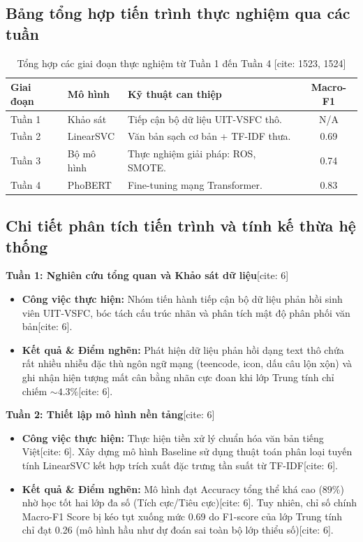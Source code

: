 \documentclass[conference,10pt,a4paper]{IEEEtran}
\begin{document}
\subsection{Bảng tổng hợp tiến trình thực nghiệm qua các tuần}
\begin{table}[H]
\centering
\caption{Tổng hợp các giai đoạn thực nghiệm từ Tuần 1 đến Tuần 4 [cite: 1523, 1524]}
\vspace{0.15cm}
\small
\renewcommand{\arraystretch}{1.2}
\begin{tabular}{|p{1.2cm}|p{1.5cm}|p{3.1cm}|c|}
\hline
\textbf{Giai đoạn} & \textbf{Mô hình} & \textbf{Kỹ thuật can thiệp} & \textbf{Macro-F1} \\
\hline
Tuần 1 & Khảo sát & Tiếp cận bộ dữ liệu UIT-VSFC thô. & N/A \\
\hline
Tuần 2 & LinearSVC & Văn bản sạch cơ bản + TF-IDF thưa. & 0.69 \\
\hline
Tuần 3 & Bộ mô hình & Thực nghiệm giải pháp: ROS, SMOTE. & 0.74 \\
\hline
Tuần 4 & PhoBERT & Fine-tuning mạng Transformer. & 0.83 \\
\hline
\end{tabular}
\end{table}

\subsection{Chi tiết phân tích tiến trình và tính kế thừa hệ thống}

\noindent \textbf{Tuần 1: Nghiên cứu tổng quan và Khảo sát dữ liệu}[cite: 6]
\begin{itemize}
    \item \textbf{Công việc thực hiện:} Nhóm tiến hành tiếp cận bộ dữ liệu phản hồi sinh viên UIT-VSFC, bóc tách cấu trúc nhãn và phân tích mật độ phân phối văn bản[cite: 6].
    \item \textbf{Kết quả \& Điểm nghẽn:} Phát hiện dữ liệu phản hồi dạng text thô chứa rất nhiều nhiễu đặc thù ngôn ngữ mạng (teencode, icon, dấu câu lộn xộn) và ghi nhận hiện tượng mất cân bằng nhãn cực đoan khi lớp Trung tính chỉ chiếm $\sim 4.3\%$[cite: 6].
\end{itemize}

\noindent \textbf{Tuần 2: Thiết lập mô hình nền tảng}[cite: 6]
\begin{itemize}
    \item \textbf{Công việc thực hiện:} Thực hiện tiền xử lý chuẩn hóa văn bản tiếng Việt[cite: 6]. Xây dựng mô hình Baseline sử dụng thuật toán phân loại tuyến tính LinearSVC kết hợp trích xuất đặc trưng tần suất từ TF-IDF[cite: 6].
    \item \textbf{Kết quả \& Điểm nghẽn:} Mô hình đạt Accuracy tổng thể khá cao ($89\%$) nhờ học tốt hai lớp đa số (Tích cực/Tiêu cực)[cite: 6]. Tuy nhiên, chỉ số chính Macro-F1 Score bị kéo tụt xuống mức 0.69 do F1-score của lớp Trung tính chỉ đạt 0.26 (mô hình hầu như dự đoán sai toàn bộ lớp thiểu số)[cite: 6].
\end{itemize}
\end{document}
